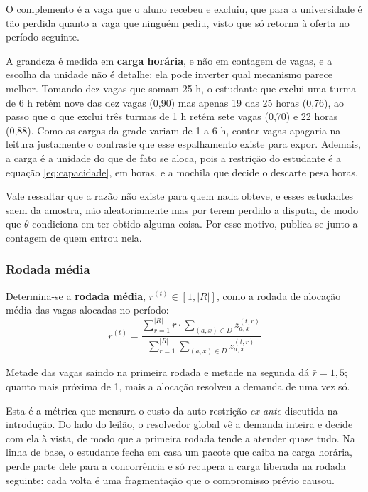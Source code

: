 \documentclass[
    12pt,
    openany,
    oneside,
    a4paper,
    english,
    brazil
]{abntex2}
\begin{document}
O complemento é a vaga que o aluno recebeu e excluiu, que para a universidade é tão perdida quanto a vaga que ninguém pediu, visto que só retorna à oferta no período seguinte.

A grandeza é medida em \textbf{carga horária}, e não em contagem de vagas, e a escolha da unidade não é detalhe: ela pode inverter qual mecanismo parece melhor. Tomando dez vagas que somam 25 h, o estudante que exclui uma turma de 6 h retém nove das dez vagas (0,90) mas apenas 19 das 25 horas (0,76), ao passo que o que exclui três turmas de 1 h retém sete vagas (0,70) e 22 horas (0,88). Como as cargas da grade variam de 1 a 6 h, contar vagas apagaria na leitura justamente o contraste que esse espalhamento existe para expor. Ademais, a carga é a unidade do que de fato se aloca, pois a restrição do estudante é a equação \eqref{eq:capacidade}, em horas, e a mochila que decide o descarte pesa horas.

Vale ressaltar que a razão não existe para quem nada obteve, e esses estudantes saem da amostra, não aleatoriamente mas por terem perdido a disputa, de modo que $\theta$ condiciona em ter obtido alguma coisa. Por esse motivo, publica-se junto a contagem de quem entrou nela.

\subsubsection{Rodada média}

Determina-se a \textbf{rodada média}, $\bar{r}^{(t)} \in [1, |R|]$, como a rodada de alocação média das vagas alocadas no período:
\begin{equation}
    \bar{r}^{(t)} = \frac{\sum_{r = 1}^{|R|} r \cdot \sum_{(a, x) \in D} z_{a, x}^{(t, r)}}{\sum_{r = 1}^{|R|} \sum_{(a, x) \in D} z_{a, x}^{(t, r)}}
\end{equation}

Metade das vagas saindo na primeira rodada e metade na segunda dá $\bar{r} = 1{,}5$; quanto mais próxima de 1, mais a alocação resolveu a demanda de uma vez só.

Esta é a métrica que mensura o custo da auto-restrição \textit{ex-ante} discutida na introdução. Do lado do leilão, o resolvedor global vê a demanda inteira e decide com ela à vista, de modo que a primeira rodada tende a atender quase tudo. Na linha de base, o estudante fecha em casa um pacote que caiba na carga horária, perde parte dele para a concorrência e só recupera a carga liberada na rodada seguinte: cada volta é uma fragmentação que o compromisso prévio causou.
\end{document}
